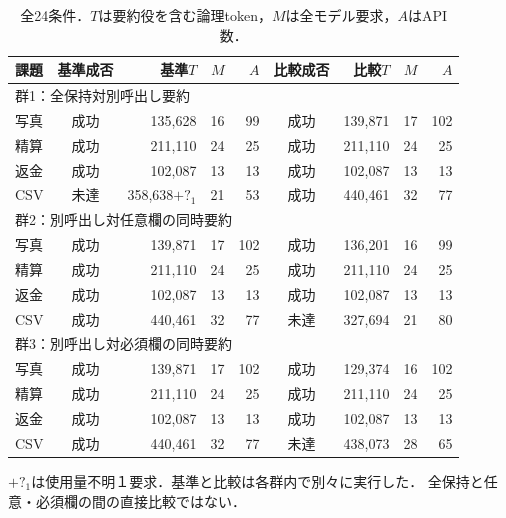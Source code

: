 \begin{table}[t]
\centering\small
\caption{全24条件．$T$は要約役を含む論理token，$M$は全モデル要求，$A$はAPI数．}
\label{tab:whole}
\begin{tabular}{lcrrrcrrr}
\hline
課題 & 基準成否 & 基準$T$ & $M$ & $A$ & 比較成否 & 比較$T$ & $M$ & $A$ \\
\hline
\multicolumn{9}{l}{群1：全保持対別呼出し要約} \\
写真 & 成功 & 135,628 & 16 & 99 & 成功 & 139,871 & 17 & 102 \\
精算 & 成功 & 211,110 & 24 & 25 & 成功 & 211,110 & 24 & 25 \\
返金 & 成功 & 102,087 & 13 & 13 & 成功 & 102,087 & 13 & 13 \\
CSV & 未達 & 358,638$+?_{1}$ & 21 & 53 & 成功 & 440,461 & 32 & 77 \\
\hline
\multicolumn{9}{l}{群2：別呼出し対任意欄の同時要約} \\
写真 & 成功 & 139,871 & 17 & 102 & 成功 & 136,201 & 16 & 99 \\
精算 & 成功 & 211,110 & 24 & 25 & 成功 & 211,110 & 24 & 25 \\
返金 & 成功 & 102,087 & 13 & 13 & 成功 & 102,087 & 13 & 13 \\
CSV & 成功 & 440,461 & 32 & 77 & 未達 & 327,694 & 21 & 80 \\
\hline
\multicolumn{9}{l}{群3：別呼出し対必須欄の同時要約} \\
写真 & 成功 & 139,871 & 17 & 102 & 成功 & 129,374 & 16 & 102 \\
精算 & 成功 & 211,110 & 24 & 25 & 成功 & 211,110 & 24 & 25 \\
返金 & 成功 & 102,087 & 13 & 13 & 成功 & 102,087 & 13 & 13 \\
CSV & 成功 & 440,461 & 32 & 77 & 未達 & 438,073 & 28 & 65 \\
\hline
\end{tabular}
\par\smallskip\footnotesize $+?_{1}$は使用量不明１要求．基準と比較は各群内で別々に実行した．
全保持と任意・必須欄の間の直接比較ではない．
\end{table}
